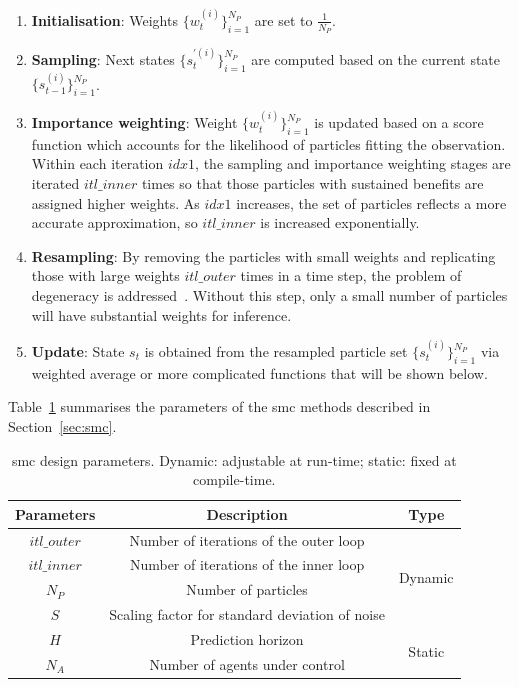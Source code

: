 \begin{enumerate}
\item \textbf{Initialisation}: Weights $\{w_t^{(i)}\}^{N_P}_{i=1}$ are set to $\frac{1}{N_P}$.
\item \textbf{Sampling}: Next states $\{s_t^{'(i)}\}^{N_P}_{i=1}$ are computed based on the current state $\{s_{t-1}^{(i)}\}^{N_P}_{i=1}$.
\item \textbf{Importance weighting}: Weight $\{w_t^{(i)}\}^{N_P}_{i=1}$ is updated based on a score function which accounts for the likelihood of particles fitting the observation.
Within each iteration $idx1$, the sampling and importance weighting stages are iterated $itl\_inner$ times so that those particles with sustained benefits are assigned higher weights.
As $idx1$ increases, the set of particles reflects a more accurate approximation, so $itl\_inner$ is increased exponentially.
\item \textbf{Resampling}: By removing the particles with small weights and replicating those with large weights
$itl\_outer$ times in a time step, the problem of degeneracy is addressed~\cite{kitagawa96}. Without this step, only a small number of particles will have substantial weights for inference.
\item \textbf{Update}: State $s_t$ is obtained from the resampled particle set $\{s_t^{(i)}\}^{N_P}_{i=1}$ via weighted average or more complicated functions that will be shown below.
\end{enumerate}

Table~\ref{tab:parameters} summarises the parameters of the \gls{smc} methods described in Section~\ref{sec:smc}.

\begin{table}
	\setlength{\tabcolsep}{3pt}
	\begin{spacing}{1.0}
	\caption{\gls{smc} design parameters. Dynamic: adjustable at run-time; static: fixed at compile-time.}
	\label{tab:parameters}
	\footnotesize
	\centering
	\smallskip
		\begin{tabular}{c|c|c}
			\hline
			 Parameters & Description & Type\\
			\hline
			\hline
			$itl\_outer$ & Number of iterations of the outer loop & \multirow{4}{*}{Dynamic}\\
			$itl\_inner$ & Number of iterations of the inner loop &\\
			$N_P$ & Number of particles &\\
			$S$ & Scaling factor for standard deviation of noise &\\
			\hline
			$H$ & Prediction horizon & \multirow{2}{*}{Static}\\
			$N_A$ & Number of agents under control &\\
			\hline
		\end{tabular}
		\end{spacing}
\end{table}


